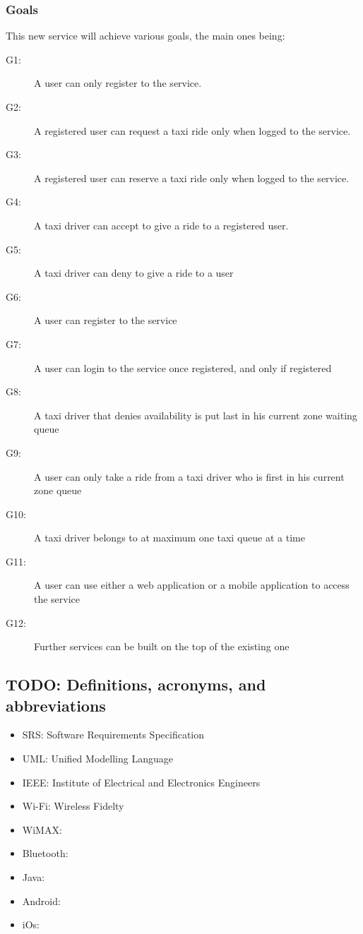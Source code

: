 \subsubsection{Goals}
This new service will achieve various goals, the main ones being:
\begin{description}
	\item[G1:] A user can only register to the service.
	\item[G2:] A registered user can request a taxi ride only when logged to the service.
	\item[G3:] A registered user can reserve a taxi ride only when logged to the service.
	\item[G4:] A taxi driver can accept to give a ride to a registered user.
	\item[G5:] A taxi driver can deny to give a ride to a user
	\item[G6:] A user can register to the service
	\item[G7:] A user can login to the service once registered, and only if registered
	\item[G8:] A taxi driver that denies availability is put last in his current zone waiting queue
	\item[G9:] A user can only take a ride from a taxi driver who is first in his current zone queue
	\item[G10:] A taxi driver belongs to at maximum one taxi queue at a time
	\item[G11:] A user can use either a web application or a mobile application to access the service
	\item[G12:] Further services can be built on the top of the existing one
\end{description}
\subsection{TODO: Definitions, acronyms, and abbreviations}
\begin{itemize}
	\item SRS: Software Requirements Specification
	\item UML: Unified Modelling Language
	\item IEEE: Institute of Electrical and Electronics Engineers
	\item Wi-Fi: Wireless Fidelty
	\item WiMAX:
	\item Bluetooth:
	\item Java:
	\item Android:
	\item iOs:
\end{itemize}
